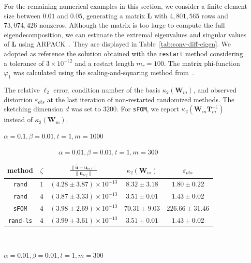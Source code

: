 \documentclass[smallextended]{svjour3}
\renewcommand{\vec}[1]{\mathbf{#1}}
\newcommand{\mat}[1]{\mathbf{#1}}
\newcommand{\norm}[1]{\| #1 \|}
\begin{document}
For the remaining numerical examples in this section, we consider a finite element size between $0.01$ and $0.05$, generating a matrix $\mat{L}$ with $4,801,565$ rows and $73,074,426$ nonzeros. Although the matrix is too large to compute the full eigendecomposition, we can estimate the extremal eigenvalues and singular values of $\mat{L}$ using ARPACK~\cite{lehoucq_arpack_1998}. They are displayed in Table~\ref{tab:conv-diff-eigen}. We adopted as reference the solution obtained with the \texttt{restart} method considering a tolerance of $3 \times 10^{-12}$ and a restart length $m_r = 100$. The matrix phi-function $\varphi_1$ was calculated using the scaling-and-squaring method from~\cite{al-mohy_new_2010,higham_scaling_2005}.

\begin{table}[t]
\centering
\caption{The relative $\ell_2$ error, condition number of the basis $\kappa_2(\mat{W}_m)$, and observed distortion $\varepsilon_{obs}$ at the last iteration of non-restarted randomized methods. The sketching dimension $d$ was set to $3200$. For \texttt{sFOM}, we report $\kappa_2(\mat{W}_m \mat{T}_m^{-1})$ instead of $\kappa_2(\mat{W}_m)$.}
\begin{subtable}{\textwidth}
\centering
\caption{$\alpha = 0.1, \beta = 0.01, t = 1, m = 1000$}
\label{tab:conv_diff_test_a_full}
\begin{tabular}{ccccc}
\hline
method & $\zeta$ & $\frac{\norm{\hat{\vec{u}} - \vec{u}_{ref}}}{\norm{\vec{u}_{ref}}}$ & $\kappa_2(\mat{W}_m)$ & $\varepsilon_{obs}$ \\
\hline
\texttt{rand} & $1$ & $(4.28 \pm 3.87) \times 10^{-13}$ & $8.32 \pm 3.18$ & $1.80 \pm 0.22$ \\
\texttt{rand} & $4$ & $(3.87 \pm 3.33) \times 10^{-13}$ & $3.51 \pm 0.01$ & $1.43 \pm 0.02$ \\
\texttt{sFOM} & $4$ & $(3.98 \pm 2.69) \times 10^{-13}$ & $70.31 \pm 9.03$ & $226.66 \pm 31.46$ \\
\texttt{rand-ls} & $4$ & $(3.99 \pm 3.61) \times 10^{-13}$ & $3.51 \pm 0.01$ & $1.43 \pm 0.02$ \\
\hline
\end{tabular}
\end{subtable} \\
\vspace{1.5em}
\begin{subtable}{\textwidth}
\caption{$\alpha = 0.01, \beta = 0.01, t = 1, m = 300$}
\label{tab:conv_diff_test_b_full}
\centering
\begin{tabular}{ccccc}

\end{tabular}
\end{subtable}
\end{table}
\end{document}
